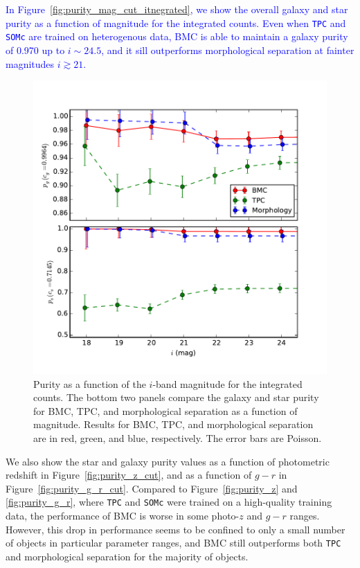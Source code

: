 \documentclass[useAMS,usenatbib]{mn2e}
\begin{document}
\textcolor{blue}{In Figure~\ref{fig:purity_mag_cut_itnegrated}, we show
the overall galaxy and star purity as a function of magnitude
for the integrated counts.
Even when \texttt{TPC} and \texttt{SOMc} are trained on heterogenous data,
BMC is able to maintain a galaxy purity of 0.970
up to $i \sim 24.5$, and it sill outperforms morphological separation
at fainter magnitudes $i \gtrsim 21$.}


\begin{figure}
  \centering
  \includegraphics[width=\linewidth]{figures/purity_mag_cut_integrated.pdf}
  \caption{Purity as a function of the $i$-band magnitude
           for the integrated counts.
           The bottom two panels compare
           the galaxy and star purity for BMC, TPC, and 
           morphological separation as a function of magnitude.
           Results for BMC, TPC, and morphological separation are in
           red, green, and blue, respectively.
           The error bars are Poisson.}
  \label{fig:purity_mag_cut_integrated}
\end{figure}


We also show the star and galaxy purity values
as a function of
photometric redshift in Figure~\ref{fig:purity_z_cut},
and as a function of $g-r$ in Figure~\ref{fig:purity_g_r_cut}.
Compared to Figure~\ref{fig:purity_z} and \ref{fig:purity_g_r},
where \texttt{TPC} and \texttt{SOMc} were trained
on a high-quality training data,
the performance of BMC is worse in some photo-$z$ and $g-r$ ranges.
However, this drop in performance seems to be confined to
only a small number of objects in particular parameter ranges,
and BMC still outperforms both \texttt{TPC} and morphological separation
for the majority of objects.
\end{document}
